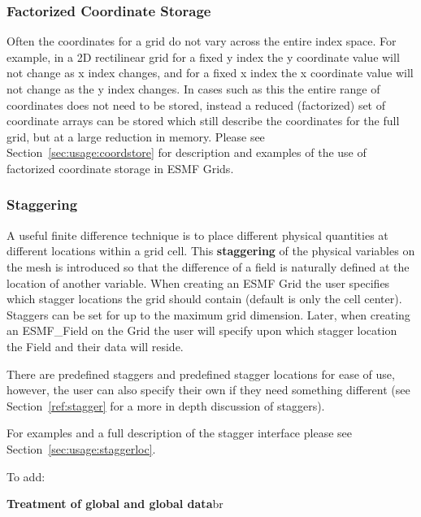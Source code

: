 \subsubsection{Factorized Coordinate Storage}

Often the coordinates for a grid do not vary across the entire
index space. For example, in a 2D rectilinear grid for a fixed y
index the y coordinate value will not change as x index changes,
and for a fixed x index the x coordinate value will not change as the
y index changes. In cases such as this the entire range of 
coordinates does not need to be stored, instead a reduced
(factorized) set of coordinate arrays can be stored which 
still describe the coordinates for the full grid, but at a large reduction in 
memory. Please see Section~\ref{sec:usage:coordstore} for
description and examples of the use of factorized coordinate
storage in ESMF Grids. 

\subsubsection{Staggering}

 A useful finite difference technique is to place different physical
quantities at different locations within a grid cell. This {\bf staggering}
of the physical variables on the mesh is introduced so that the difference
of a field is naturally defined at the location of another variable. When creating an 
ESMF Grid the user specifies which stagger locations the grid should 
contain (default is only the cell center).  Staggers can be set for up to the 
maximum grid dimension.  Later, when creating an  ESMF\_Field on the Grid the user
will specify upon which stagger location the Field and their data will reside.

There are predefined staggers and predefined stagger locations for ease of use,
however, the user can also specify their own if they need something different 
(see Section~\ref{ref:stagger} for a more in depth discussion of staggers).
 
For examples and a full description of the stagger interface 
please see Section~\ref{sec:usage:staggerloc}. 

To add:

{\bf Treatment of global and global data}{br}
 


